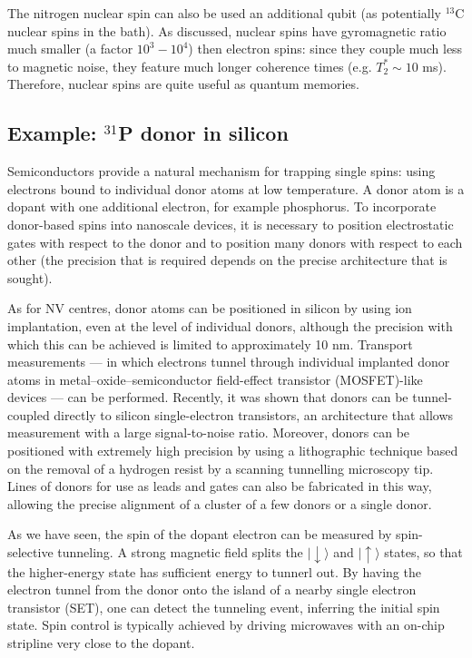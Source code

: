 \documentclass[a4paper,11pt]{article}
\newcommand{\ket}[1]{| #1 \rangle}
\begin{document}
The nitrogen nuclear spin can also be used an additional qubit (as potentially $^{13}$C nuclear spins in the bath). As discussed, nuclear spins have gyromagnetic ratio much smaller (a factor $10^3-10^4$) then electron spins: since they couple much less to magnetic noise, they feature much longer coherence times (e.g. $T_2^* \sim 10$ ms). Therefore, nuclear spins are quite useful as quantum memories.

\subsection {Example: $^{31}$P donor in silicon}
Semiconductors provide a natural mechanism for trapping single spins: using electrons bound to individual donor atoms at low temperature. A donor atom is a dopant with one additional electron, for example phosphorus. To incorporate donor-based spins into nanoscale devices, it is necessary to position electrostatic gates with respect to the donor and to position many donors with respect to each other (the precision that is required depends on the precise architecture that is sought).

As for NV centres, donor atoms can be positioned in silicon by using ion implantation, even at the level of individual donors, although the precision with which this can be achieved is limited to approximately 10 nm. Transport measurements — in which electrons tunnel through individual implanted donor atoms in metal–oxide–semiconductor field-effect transistor (MOSFET)-like devices — can be performed. Recently, it was shown that donors can be tunnel-coupled directly to silicon single-electron transistors, an architecture that allows measurement with a large signal-to-noise ratio. Moreover, donors can be positioned with extremely high precision by using a lithographic technique based on the removal of a hydrogen resist by a scanning tunnelling microscopy tip. Lines of donors for use as leads and gates can also be fabricated in this way, allowing the precise alignment of a cluster of a few donors or a single donor.

As we have seen, the spin of the dopant electron can be measured by spin-selective tunneling. A strong magnetic field splits the $\ket{\downarrow}$ and $\ket{\uparrow}$ states, so that the higher-energy state has sufficient energy to tunnerl out. By having the electron tunnel from the donor onto the island of a nearby single electron transistor (SET), one can detect the tunneling event, inferring the initial spin state. Spin control is typically achieved by driving microwaves with an on-chip stripline very close to the dopant.
\end{document}
